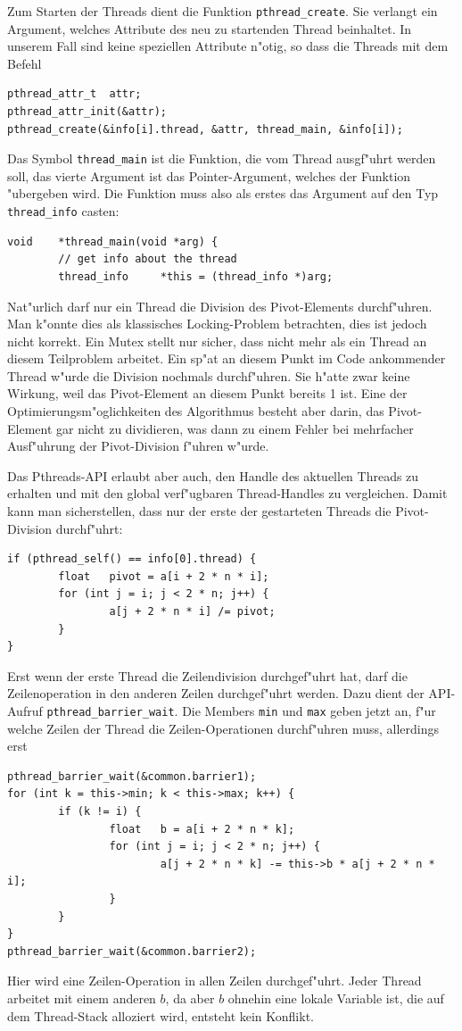 Zum Starten der Threads dient die Funktion \verb+pthread_create+.
Sie verlangt ein Argument, welches Attribute des neu zu startenden
Thread beinhaltet. In unserem Fall sind keine speziellen Attribute
n"otig, so dass die Threads mit dem Befehl
\begin{verbatim}
pthread_attr_t  attr;
pthread_attr_init(&attr);
pthread_create(&info[i].thread, &attr, thread_main, &info[i]);
\end{verbatim}
Das Symbol \verb+thread_main+ ist die Funktion, die vom Thread
ausgf"uhrt werden soll, das vierte Argument ist das Pointer-Argument,
welches der Funktion "ubergeben wird.
Die Funktion muss also als erstes das Argument auf den Typ \verb+thread_info+
casten:
\begin{verbatim}
void    *thread_main(void *arg) {
        // get info about the thread
        thread_info     *this = (thread_info *)arg;
\end{verbatim}
Nat"urlich darf nur ein Thread die Division des Pivot-Elements durchf"uhren.
Man k"onnte dies als klassisches Locking-Problem betrachten, dies ist
jedoch nicht korrekt. Ein Mutex stellt nur sicher, dass nicht mehr als
ein Thread an diesem Teilproblem arbeitet. Ein sp"at an diesem Punkt
im Code ankommender Thread w"urde die Division nochmals durchf"uhren.
Sie h"atte zwar keine Wirkung, weil das Pivot-Element an diesem Punkt
bereits 1 ist. Eine der Optimierungsm"oglichkeiten des Algorithmus
besteht aber darin, das Pivot-Element gar nicht zu dividieren, was
dann zu einem Fehler bei mehrfacher Ausf"uhrung der Pivot-Division
f"uhren w"urde.

Das Pthreads-API erlaubt aber auch, den Handle des aktuellen Threads
zu erhalten und mit den global verf"ugbaren Thread-Handles zu
vergleichen. Damit kann man sicherstellen, dass nur der erste der
gestarteten Threads die Pivot-Division durchf"uhrt:
\begin{verbatim}
if (pthread_self() == info[0].thread) {
        float   pivot = a[i + 2 * n * i];
        for (int j = i; j < 2 * n; j++) {
                a[j + 2 * n * i] /= pivot;
        }
}
\end{verbatim}

Erst wenn der erste Thread die Zeilendivision durchgef"uhrt hat, darf 
die Zeilenoperation in den anderen Zeilen durchgef"uhrt werden. Dazu
dient der API-Aufruf \verb+pthread_barrier_wait+.
Die Members {\tt min} und {\tt max} geben jetzt an, f"ur welche Zeilen
der Thread die Zeilen-Operationen durchf"uhren muss, allerdings erst
\begin{verbatim}
pthread_barrier_wait(&common.barrier1);
for (int k = this->min; k < this->max; k++) {
        if (k != i) {
                float   b = a[i + 2 * n * k];
                for (int j = i; j < 2 * n; j++) {
                        a[j + 2 * n * k] -= this->b * a[j + 2 * n * i];
                }
        }
}
pthread_barrier_wait(&common.barrier2);
\end{verbatim}
Hier wird eine Zeilen-Operation in allen Zeilen durchgef"uhrt.
Jeder Thread arbeitet mit einem anderen $b$, da aber $b$ ohnehin
eine lokale Variable ist, die auf dem Thread-Stack alloziert wird,
entsteht kein Konflikt.

